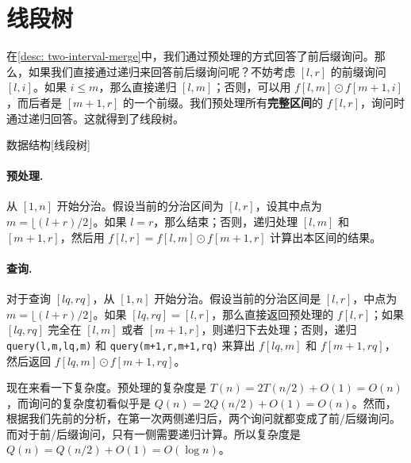 \section{线段树}

在\cref{desc: two-interval-merge}中，我们通过预处理的方式回答了前后缀询问。那么，如果我们直接通过递归来回答前后缀询问呢？不妨考虑 $[l,r]$ 的前缀询问 $[l,i]$。如果 $i\le m$，那么直接递归 $[l,m]$；否则，可以用 $f[l,m]\odot f[m+1,i]$，而后者是 $[m+1,r]$ 的一个前缀。我们预处理所有\textbf{完整区间}的 $f[l,r]$，询问时通过递归回答。这就得到了线段树。

\begin{descbox}{数据结构}[线段树]\label{desc: segment-tree}
\paragraph{预处理. }从 $[1,n]$ 开始分治。假设当前的分治区间为 $[l,r]$，设其中点为 $m=\lfloor (l+r)/2\rfloor$。如果 $l=r$，那么结束；否则，递归处理 $[l,m]$ 和 $[m+1,r]$，然后用 $f[l,r]=f[l,m]\odot f[m+1,r]$ 计算出本区间的结果。

\paragraph{查询. }对于查询 $[lq,rq]$，从 $[1,n]$ 开始分治。假设当前的分治区间是 $[l,r]$，中点为 $m=\lfloor (l+r)/2\rfloor$。如果 $[lq,rq]=[l,r]$，那么直接返回预处理的 $f[l,r]$；如果 $[lq,rq]$ 完全在 $[l,m]$ 或者 $[m+1,r]$，则递归下去处理；否则，递归 \texttt{query(l,m,lq,m)} 和 \texttt{query(m+1,r,m+1,rq)} 来算出 $f[lq,m]$ 和 $f[m+1,rq]$，然后返回 $f[lq,m]\odot f[m+1,rq]$。
\end{descbox}

现在来看一下复杂度。预处理的复杂度是 $T(n)=2T(n/2)+O(1)=O(n)$，而询问的复杂度初看似乎是 $Q(n)=2Q(n/2)+O(1)=O(n)$。然而，根据我们先前的分析，在第一次两侧递归后，两个询问就都变成了前/后缀询问。而对于前/后缀询问，只有一侧需要递归计算。所以复杂度是 $Q(n)=Q(n/2)+O(1)=O(\log n)$。


